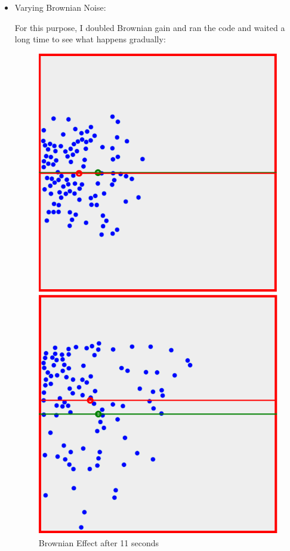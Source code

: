 \begin{itemize}
\item Varying Brownian Noise:

For this purpose, I doubled Brownian gain and ran the code and waited a long time to see what happens gradually:
\begin{figure}[!htb]
\captionsetup{justification=centering}
  \includegraphics[width=\linewidth]{fig/brownian2in11.png}
  \caption{Brownian Effect after 11 seconds}
\endminipage\hfill
{}
  \includegraphics[width=\linewidth]{fig/brownian2in45.png}

\end{figure}
\end{itemize}
